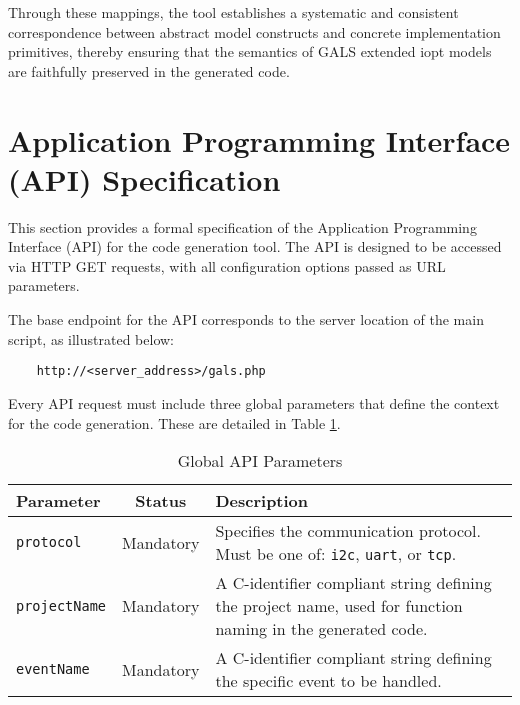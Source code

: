 Through these mappings, the tool establishes a systematic and consistent correspondence between abstract model constructs and concrete implementation primitives, thereby ensuring that the semantics of GALS extended \gls{iopt} models are faithfully preserved in the generated code.



\section{Application Programming Interface (API) Specification}
\label{sec:api_spec}

This section provides a formal specification of the Application Programming Interface (API) for the code generation tool. The API is designed to be accessed via HTTP GET requests, with all configuration options passed as URL parameters.

The base endpoint for the API corresponds to the server location of the main script, as illustrated below:
\begin{verbatim}
    http://<server_address>/gals.php
\end{verbatim}

Every API request must include three global parameters that define the context for the code generation. These are detailed in Table \ref{tab:global_params}.

\begin{table}[h!]
    \centering
    \caption{Global API Parameters}
    \label{tab:global_params}
    \begin{tabular}{|l|c|p{9cm}|}
        \hline
        \textbf{Parameter} & \textbf{Status} & \textbf{Description} \\ \hline
        \texttt{protocol} & Mandatory & Specifies the communication protocol. Must be one of: \texttt{i2c}, \texttt{uart}, or \texttt{tcp}. \\ \hline
        \texttt{projectName} & Mandatory & A C-identifier compliant string defining the project name, used for function naming in the generated code. \\ \hline
        \texttt{eventName} & Mandatory & A C-identifier compliant string defining the specific event to be handled. \\ \hline
    \end{tabular}
\end{table}

